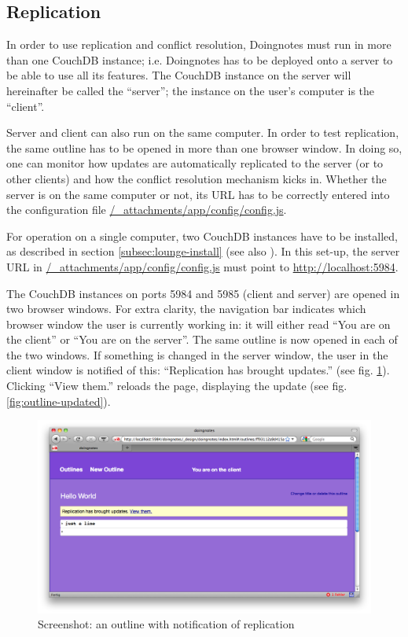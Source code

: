 \subsection{Replication}

In order to use replication and conflict resolution, Doingnotes must run in more than one CouchDB instance; i.e. Doingnotes has to be deployed onto a server to be able to use all its features. The CouchDB instance on the server will hereinafter be called the \enquote{server}; the instance on the user's computer is the \enquote{client}.

Server and client can also run on the same computer. In order to test replication, the same outline has to be opened in more than one browser window. In doing so, one can monitor how updates are automatically replicated to the server (or to other clients) and how the conflict resolution mechanism kicks in. Whether the server is on the same computer or not, its URL has to be correctly entered into the configuration file {\url{/_attachments/app/config/config.js}}.

For operation on a single computer, two CouchDB instances have to be installed, as described in section \ref{subsec:lounge-install} (see also \cite{lounge:twoinstances}). In this set-up, the server URL in {\url{/\_attachments/app/config/config.js}} must point to {\url{http://localhost:5984}}.

The CouchDB instances on ports 5984 and 5985 (client and server) are opened in two browser windows. For extra clarity, the navigation bar indicates which browser window the user is currently working in: it will either read \enquote{You are on the client} or \enquote{You are on the server}. The same outline is now opened in each of the two windows. If something is changed in the server window, the user in the client window is notified of this: \enquote{Replication has brought updates.} (see fig. \ref{fig:outline-note}). Clicking \enquote{View them.} reloads the page, displaying the update (see fig. \ref{fig:outline-updated}).


\medskip
\begin{figure}[ht]
  \begin{center}
  \includegraphics[width=\textwidth]{grafik/screenshot-outline-replication-note}
  \end{center}
  \caption{Screenshot: an outline with notification of replication}
  \label{fig:outline-note}
\end{figure}


